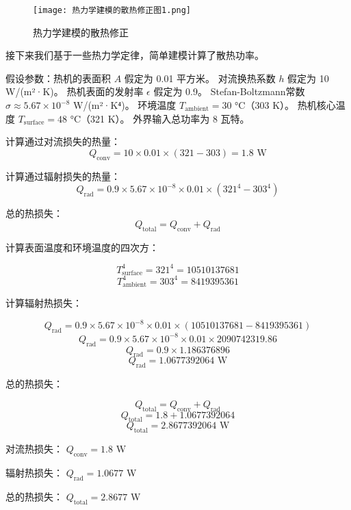 \documentclass[dvipsnames, svgnames,a4paper,11pt]{article}
\begin{document}
        \begin{figure}[htbp]
            \centering
            \texttt{[image: 热力学建模的散热修正图1.png]}
            \caption{热力学建模的散热修正}
            \label{fig:热力学建模的散热修正图1}
        \end{figure}
    
        接下来我们基于一些热力学定律，简单建模计算了散热功率。

        假设参数：热机的表面积 \( A \) 假定为 0.01 平方米。
        对流换热系数 \( h \) 假定为 10 W/(m²·K)。
        热机表面的发射率 \( \epsilon \) 假定为 0.9。
        Stefan-Boltzmann常数 \( \sigma \approx 5.67 \times 10^{-8} \) W/(m²·K⁴)。
        环境温度 \( T_{\text{ambient}} = 30 \) °C（303 K）。
        热机核心温度 \( T_{\text{surface}} = 48 \) °C（321 K）。
        外界输入总功率为 8 瓦特。

                计算通过对流损失的热量：
        \[
        Q_{\text{conv}} = 10 \times 0.01 \times (321 - 303) = 1.8 \text{ W}
        \]

        计算通过辐射损失的热量：
        \[
        Q_{\text{rad}} = 0.9 \times 5.67 \times 10^{-8} \times 0.01 \times (321^4 - 303^4)
        \]

        总的热损失：
        \[
        Q_{\text{total}} = Q_{\text{conv}} + Q_{\text{rad}}
        \]

        计算表面温度和环境温度的四次方：

        \[ T_{\text{surface}}^4 = 321^4 = 10510137681 \]
        \[ T_{\text{ambient}}^4 = 303^4 = 8419395361 \]

        计算辐射热损失：

        \[ Q_{\text{rad}} = 0.9 \times 5.67 \times 10^{-8} \times 0.01 \times (10510137681 - 8419395361) \]
        \[ Q_{\text{rad}} = 0.9 \times 5.67 \times 10^{-8} \times 0.01 \times 2090742319.86 \]
        \[ Q_{\text{rad}} = 0.9 \times 1.186376896 \]
        \[ Q_{\text{rad}} = 1.0677392064 \text{ W} \]


        总的热损失：

        \[ Q_{\text{total}} = Q_{\text{conv}} + Q_{\text{rad}} \]
        \[ Q_{\text{total}} = 1.8 + 1.0677392064 \]
        \[ Q_{\text{total}} = 2.8677392064 \text{ W} \]

        对流热损失： \( Q_{\text{conv}} = 1.8 \) W

        辐射热损失： \( Q_{\text{rad}} = 1.0677 \) W

        总的热损失： \( Q_{\text{total}} = 2.8677 \) W
\end{document}
